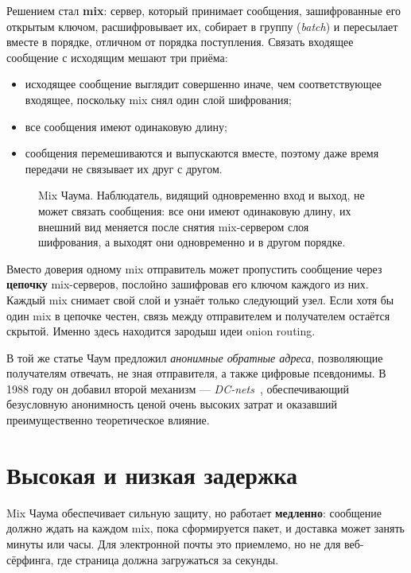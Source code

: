 Решением стал \textbf{mix}: сервер, который принимает сообщения, зашифрованные его открытым ключом, расшифровывает их, собирает в группу (\emph{batch}) и пересылает вместе в порядке, отличном от порядка поступления. Связать входящее сообщение с исходящим мешают три приёма:
\begin{itemize}
  \item исходящее сообщение выглядит совершенно иначе, чем соответствующее входящее, поскольку mix снял один слой шифрования;
  \item все сообщения имеют одинаковую длину;
  \item сообщения перемешиваются и выпускаются вместе, поэтому даже время передачи не связывает их друг с другом.
\end{itemize}
\begin{figure}[htbp]
\centering

\caption{Mix Чаума. Наблюдатель, видящий одновременно вход и выход, не может связать сообщения: все они имеют одинаковую длину, их внешний вид меняется после снятия mix-сервером слоя шифрования, а выходят они одновременно и в другом порядке.}
\label{fig:mix}
\end{figure}

Вместо доверия одному mix отправитель может пропустить сообщение через \textbf{цепочку} mix-серверов, послойно зашифровав его ключом каждого из них. Каждый mix снимает свой слой и узнаёт только следующий узел. Если хотя бы один mix в цепочке честен, связь между отправителем и получателем остаётся скрытой. Именно здесь находится зародыш идеи onion routing.

В той же статье Чаум предложил \emph{анонимные обратные адреса}, позволяющие получателям отвечать, не зная отправителя, а также цифровые псевдонимы. В 1988 году он добавил второй механизм --- \emph{DC-nets}~\cite{chaum1988dining}, обеспечивающий безусловную анонимность ценой очень высоких затрат и оказавший преимущественно теоретическое влияние.

\section{Высокая и низкая задержка}\label{sec:radici-latenza}

Mix Чаума обеспечивает сильную защиту, но работает \textbf{медленно}: сообщение должно ждать на каждом mix, пока сформируется пакет, и доставка может занять минуты или часы. Для электронной почты это приемлемо, но не для веб-сёрфинга, где страница должна загружаться за секунды.

